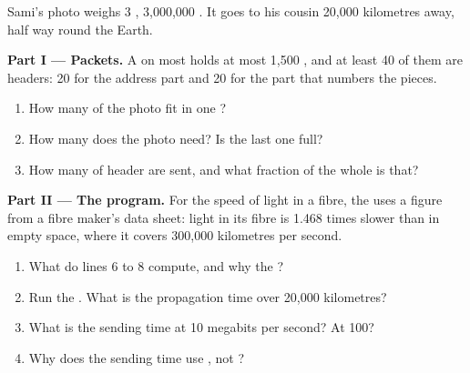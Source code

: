 \begin{problem}\label{pb:g8:how-the-internet-works:1}
Sami's photo weighs 3 , 3,000,000 . It goes to his cousin
20,000 kilometres away, half way round the Earth.

\medskip\noindent\textbf{Part I --- Packets.}
A  on most  holds at most 1,500 , and at least 40 of them
are headers: 20 for the address part and 20 for the part that numbers the
pieces.
\begin{enumerate}
  \item How many  of the photo fit in one ?
  \item How many  does the photo need? Is the last one full?
  \item How many  of header are sent, and what fraction of the whole is
    that?
\end{enumerate}

\medskip\noindent\textbf{Part II --- The program.}
For the speed of light in a fibre, the  uses a figure from a fibre
maker's data sheet: light in its fibre is 1.468 times slower than in empty
space, where it covers 300,000 kilometres per second.

\label{lst:g8:how-the-internet-works:photo}

\begin{enumerate}[resume]
  \item What do lines 6 to 8 compute, and why the ?
  \item Run the . What is the propagation time over 20,000 kilometres?
  \item What is the sending time at 10 megabits per second? At 100?
  \item Why does the sending time use , not ?
\end{enumerate}


\end{problem}
